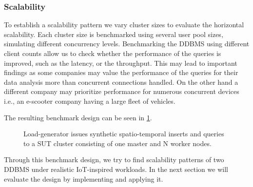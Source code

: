 \subsubsection{Scalability}
To establish a scalability pattern we vary cluster sizes to evaluate the horizontal scalability.
Each cluster size is benchmarked using several user pool sizes, simulating different concurrency levels.
Benchmarking the DDBMS using different client counts allow us to check whether the performance of the queries is improved, such as the latency, or the throughput.
This may lead to important findings as some companies may value the performance of the queries for their data analysis more than concurrent connections handled.
On the other hand a different company may prioritize performance for numerous concurrent devices i.e., an e-scooter company having a large fleet of vehicles.

The resulting benchmark design can be seen in \cref{fig:benchmark-design}.

\begin{figure}[ht]
	\centering
	\caption{
		Load-generator issues synthetic spatio-temporal inserts and queries to a SUT cluster consisting of one master and N worker nodes.
	}
	\label{fig:benchmark-design}
\end{figure}

Through this benchmark design, we try to find scalability patterns of two DDBMS under realistic IoT-inspired workloads.
In the next section we will evaluate the design by implementing and applying it.
